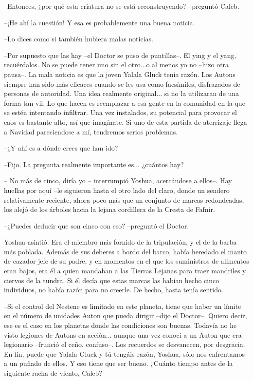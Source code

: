 --Entonces, ¿por qué esta criatura no se está reconstruyendo? --preguntó Caleb.
 
--¡He ahí la cuestión! Y esa es probablemente una buena noticia.
 
--Lo dices como si también hubiera malas noticias.
 
--Por supuesto que las hay --el Doctor se puso de puntillas--. El ying y el yang, recuérdalos. No se puede tener uno sin el otro...o al menos yo no --hizo otra pausa--. La mala noticia es que la joven Yalala Gluck tenía razón. Los Autons siempre han sido más eficaces cuando se les usa como facsímiles, disfrazados de personas de autoridad. Una idea realmente original... si no la utilizaran de una forma tan vil. Lo que hacen es reemplazar a esa gente en la comunidad en la que se estén intentando infiltrar. Una vez instalados, su potencial para provocar el caos es bastante alto, así que imagínate. Si uno de esta partida de aterrizaje llega a Navidad pareciendose a mí, tendremos serios problemas.
 
--¿Y ahí es a dónde crees que han ido?
 
--Fijo. La pregunta realmente importante es... ¿cuántos hay?
 
-- No más de cinco, diría yo -- interrumpió Yoshua, acercándose a ellos--. Hay huellas por aquí --le siguieron hasta el otro lado del claro, donde un sendero relativamente reciente, ahora poco más que un conjunto de marcas redondeadas, los alejó de los árboles hacia la lejana cordillera de la Cresta de Fafnir.
 
--¿Puedes deducir que son cinco con eso? --preguntó el Doctor.
 
Yoshua asintió. Era el miembro más fornido de la tripulación, y el de la barba más poblada. Además de sus deberes a bordo del barco, había heredado el manto de cazador jefe de su padre, y en momentos en el que los suministros de alimentos eran bajos, era él a quien mandaban a las Tierras Lejanas para traer mandriles y ciervos de la tundra. Si él decía que estas marcas las habían hecho cinco individuos, no había razón para no creerle. De hecho, hasta tenía sentido.
 
--Si el control del Nestene es limitado en este planeta, tiene que haber un límite en el número de unidades Auton que pueda dirigir --dijo el Doctor--. Quiero decir, ese es el caso en los planetas donde las condiciones son buenas. Todavía no he visto legiones de Autons en acción... aunque una vez conocí a un Auton que era legionario --frunció el ceño, confuso--. Los recuerdos se desvanecen, por desgracia. En fin, puede que Yalala Gluck y tú tengáis razón, Yoshua, sólo nos enfrentamos a un puñado de ellos. Y eso tiene que ser bueno. ¿Cuánto tiempo antes de la siguiente racha de viento, Caleb?
 
